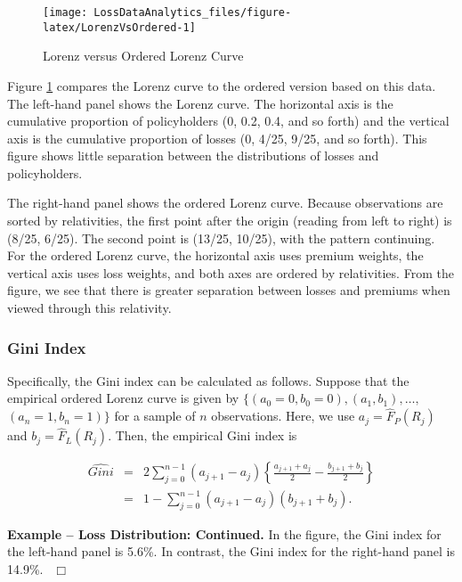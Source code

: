 \documentclass[]{book}
\theoremstyle{definition}
\theoremstyle{definition}
\theoremstyle{definition}
\theoremstyle{remark}
\begin{document}
\hypertarget{toggleLorenz}{}
\begin{figure}

{\centering \texttt{[image: LossDataAnalytics\_files/figure-latex/LorenzVsOrdered-1]} 

}

\caption{Lorenz versus Ordered Lorenz Curve}\label{fig:LorenzVsOrdered}
\end{figure}

Figure \ref{fig:LorenzVsOrdered} compares the Lorenz curve to the
ordered version based on this data. The left-hand panel shows the Lorenz
curve. The horizontal axis is the cumulative proportion of policyholders
(0, 0.2, 0.4, and so forth) and the vertical axis is the cumulative
proportion of losses (0, 4/25, 9/25, and so forth). This figure shows
little separation between the distributions of losses and policyholders.

The right-hand panel shows the ordered Lorenz curve. Because
observations are sorted by relativities, the first point after the
origin (reading from left to right) is (8/25, 6/25). The second point is
(13/25, 10/25), with the pattern continuing. For the ordered Lorenz
curve, the horizontal axis uses premium weights, the vertical axis uses
loss weights, and both axes are ordered by relativities. From the
figure, we see that there is greater separation between losses and
premiums when viewed through this relativity.

\subsubsection*{Gini Index}\label{gini-index}

Specifically, the Gini index can be calculated as follows. Suppose that
the empirical ordered Lorenz curve is given by
\(\{ (a_0=0, b_0=0), (a_1, b_1), \ldots,\) \((a_n=1, b_n=1) \}\) for a
sample of \(n\) observations. Here, we use \(a_j = \hat{F}_P(R_j)\) and
\(b_j = \hat{F}_{L}(R_j)\). Then, the empirical Gini index is

\begin{eqnarray}
\widehat{Gini} &=&  2\sum_{j=0}^{n-1} (a_{j+1} - a_j) \left \{
\frac{a_{j+1}+a_j}{2} - \frac{b_{j+1}+b_j}{2} \right\} \nonumber \\
&=& 1 - \sum_{j=0}^{n-1} (a_{j+1} - a_j) (b_{j+1}+b_j) .\label{eq:GiniDefn}
\end{eqnarray}

\textbf{Example -- Loss Distribution: Continued.} In the figure, the
Gini index for the left-hand panel is 5.6\%. In contrast, the Gini index
for the right-hand panel is 14.9\%. \(~~\Box\)
\end{document}
